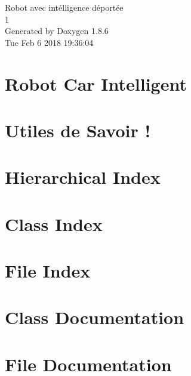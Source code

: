 \documentclass[twoside]{book}
\newcommand{\clearemptydoublepage}{%
  \newpage{\pagestyle{empty}\cleardoublepage}%
}
\begin{document}
\hypersetup{pageanchor=false}
\begin{titlepage}
\vspace*{7cm}
\begin{center}%
{\Large Robot avec intélligence déportée \\[1ex]\large 1 }\\
\vspace*{1cm}
{\large Generated by Doxygen 1.8.6}\\
\vspace*{0.5cm}
{\small Tue Feb 6 2018 19:36:04}\\
\end{center}
\end{titlepage}
\clearemptydoublepage
\tableofcontents
\clearemptydoublepage
{}
\hypersetup{pageanchor=true}

\chapter{Robot Car Intelligent}
\label{md__r_e_a_d_m_e}
\hypertarget{md__r_e_a_d_m_e}{}

\chapter{Utiles de Savoir !}
\label{md__utiles}
\hypertarget{md__utiles}{}

\chapter{Hierarchical Index}

\chapter{Class Index}

\chapter{File Index}

\chapter{Class Documentation}














\chapter{File Documentation}


























\newpage
{}
{}
\printindex
\end{document}
